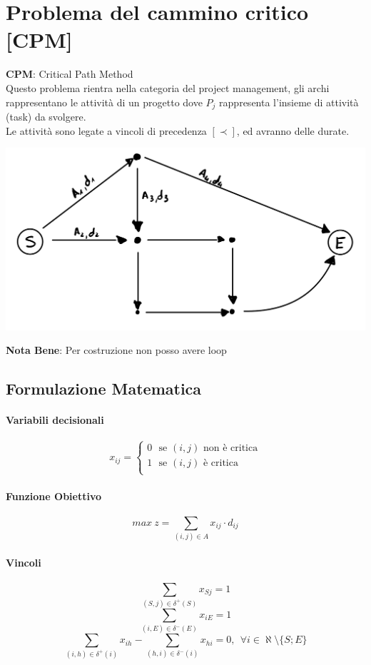 \documentclass[12pt,a4paper]{article}
\begin{document}
\clearpage
\section{Problema del cammino critico [CPM]}
\textbf{CPM}: Critical Path Method\\
Questo problema rientra nella categoria del project management, gli archi rappresentano le attività di un progetto dove $P_j$ rappresenta l'insieme di attività (task) da svolgere.\\
Le attività sono legate a vincoli di precedenza $[\prec]$, ed avranno delle durate.
\begin{center}
\includegraphics[width=0.6\columnwidth]{img/cpm.jpeg}
\end{center}
\textbf{Nota Bene}: Per costruzione non posso avere loop

\subsection{Formulazione Matematica}
\paragraph{Variabili decisionali} $$x_{ij} = \begin{cases}
0 \ \ \ \text{se $(i,j)$ non è critica}\\
1 \ \ \ \text{se $(i,j)$ è critica}\\
\end{cases}$$
\paragraph{Funzione Obiettivo} $$max\ z = \sum_{(i,j)\in A} x_{ij}\cdot d_{ij}$$
\paragraph{Vincoli}
$$\sum_{(S,j) \in \delta^+(S)} x_{Sj}= 1$$
$$\sum_{(i,E) \in \delta^-(E)} x_{iE}= 1$$
$$\sum_{(i,h) \in \delta^+(i)} x_{ih} - \sum_{(h,i) \in \delta^-(i)} x_{hi} = 0, \ \ \forall i \in \aleph \setminus \{S; E\}$$
\end{document}
